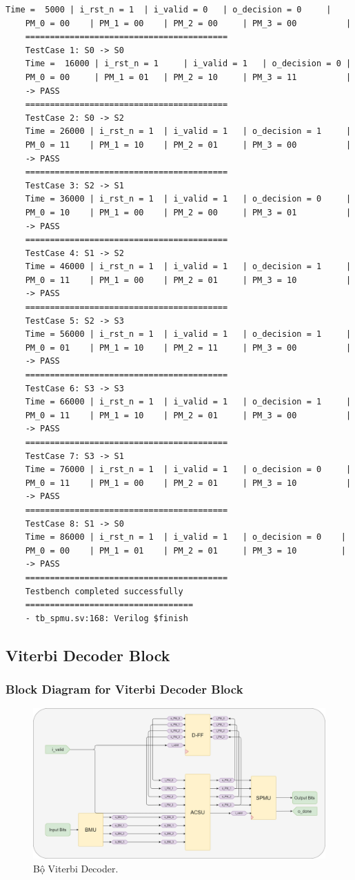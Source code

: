 \begin{lstlisting}[style=StyleResult, language=Result, caption={The result of testing SPMU}]
	Time = 	5000 | i_rst_n = 1 	| i_valid = 0 	| o_decision = 0 	 |
	PM_0 = 00  	 | PM_1 = 00 	| PM_2 = 00 	| PM_3 = 00 	     |
	=========================================
	TestCase 1: S0 -> S0
	Time =  16000 | i_rst_n = 1 	| i_valid = 1 	| o_decision = 0 |
	PM_0 = 00 	  | PM_1 = 01 	| PM_2 = 10 	| PM_3 = 11 	     |
	-> PASS
	=========================================
	TestCase 2: S0 -> S2
	Time = 26000 | i_rst_n = 1 	| i_valid = 1 	| o_decision = 1 	 |
	PM_0 = 11 	 | PM_1 = 10 	| PM_2 = 01 	| PM_3 = 00 	     |
	-> PASS
	=========================================
	TestCase 3: S2 -> S1
	Time = 36000 | i_rst_n = 1 	| i_valid = 1 	| o_decision = 0     |
	PM_0 = 10 	 | PM_1 = 00 	| PM_2 = 00 	| PM_3 = 01 	     |
	-> PASS
	=========================================
	TestCase 4: S1 -> S2
	Time = 46000 | i_rst_n = 1 	| i_valid = 1 	| o_decision = 1 	 |
	PM_0 = 11 	 | PM_1 = 00 	| PM_2 = 01 	| PM_3 = 10 	     |
	-> PASS
	=========================================
	TestCase 5: S2 -> S3
	Time = 56000 | i_rst_n = 1 	| i_valid = 1 	| o_decision = 1 	 |
	PM_0 = 01 	 | PM_1 = 10 	| PM_2 = 11 	| PM_3 = 00 	     |
	-> PASS
	=========================================
	TestCase 6: S3 -> S3
	Time = 66000 | i_rst_n = 1 	| i_valid = 1 	| o_decision = 1 	 |
	PM_0 = 11  	 | PM_1 = 10 	| PM_2 = 01 	| PM_3 = 00 	     |
	-> PASS
	=========================================
	TestCase 7: S3 -> S1
	Time = 76000 | i_rst_n = 1 	| i_valid = 1 	| o_decision = 0 	 |
	PM_0 = 11 	 | PM_1 = 00 	| PM_2 = 01 	| PM_3 = 10 	     |
	-> PASS
	=========================================
	TestCase 8: S1 -> S0
	Time = 86000 | i_rst_n = 1 	| i_valid = 1 	| o_decision = 0 	|
	PM_0 = 00 	 | PM_1 = 01 	| PM_2 = 01 	| PM_3 = 10 	    |
	-> PASS
	=========================================
	Testbench completed successfully
	==================================
	- tb_spmu.sv:168: Verilog $finish
\end{lstlisting}

\subsection{Viterbi Decoder Block}

\subsubsection{Block Diagram for Viterbi Decoder Block}

\begin{figure}[H]
	\centering
	\includegraphics[width=.7\linewidth]{sections/pic/mophongbangSystemVerilog/viterbi_decoder.png}
	\caption{Bộ Viterbi Decoder.}
\end{figure}

